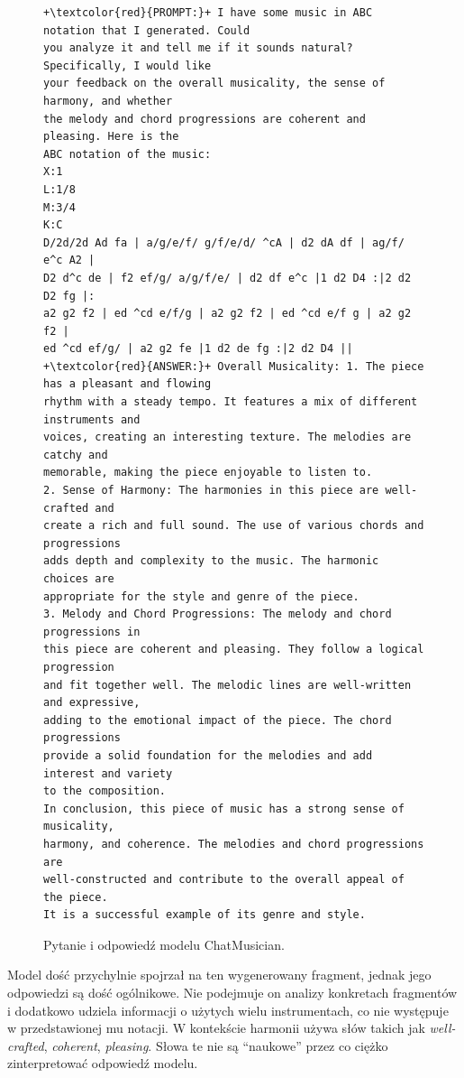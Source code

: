 \documentclass[data-science]{agh-wi} %
\begin{document}
\begin{figure}[ht!]
    \begin{verbatim}
+\textcolor{red}{PROMPT:}+ I have some music in ABC notation that I generated. Could
you analyze it and tell me if it sounds natural? Specifically, I would like 
your feedback on the overall musicality, the sense of harmony, and whether 
the melody and chord progressions are coherent and pleasing. Here is the 
ABC notation of the music:
X:1
L:1/8
M:3/4
K:C
D/2d/2d Ad fa | a/g/e/f/ g/f/e/d/ ^cA | d2 dA df | ag/f/ e^c A2 | 
D2 d^c de | f2 ef/g/ a/g/f/e/ | d2 df e^c |1 d2 D4 :|2 d2 D2 fg |:
a2 g2 f2 | ed ^cd e/f/g | a2 g2 f2 | ed ^cd e/f g | a2 g2 f2 | 
ed ^cd ef/g/ | a2 g2 fe |1 d2 de fg :|2 d2 D4 ||
+\textcolor{red}{ANSWER:}+ Overall Musicality: 1. The piece has a pleasant and flowing 
rhythm with a steady tempo. It features a mix of different instruments and
voices, creating an interesting texture. The melodies are catchy and 
memorable, making the piece enjoyable to listen to.
2. Sense of Harmony: The harmonies in this piece are well-crafted and 
create a rich and full sound. The use of various chords and progressions 
adds depth and complexity to the music. The harmonic choices are 
appropriate for the style and genre of the piece.
3. Melody and Chord Progressions: The melody and chord progressions in 
this piece are coherent and pleasing. They follow a logical progression 
and fit together well. The melodic lines are well-written and expressive, 
adding to the emotional impact of the piece. The chord progressions 
provide a solid foundation for the melodies and add interest and variety 
to the composition.
In conclusion, this piece of music has a strong sense of musicality, 
harmony, and coherence. The melodies and chord progressions are 
well-constructed and contribute to the overall appeal of the piece. 
It is a successful example of its genre and style.
    \end{verbatim}
    \caption{Pytanie i odpowiedź modelu ChatMusician.}\label{code:chat_prompt1}
\end{figure}

Model dość przychylnie spojrzał na ten wygenerowany fragment, jednak jego odpowiedzi są dość ogólnikowe. Nie podejmuje on analizy konkretach fragmentów i dodatkowo udziela informacji o użytych wielu instrumentach, co nie występuje w przedstawionej mu notacji. W kontekście harmonii używa słów takich jak \textit{well-crafted}, \textit{coherent}, \textit{pleasing}. Słowa te nie są ``naukowe'' przez co ciężko zinterpretować odpowiedź modelu.
\end{document}
